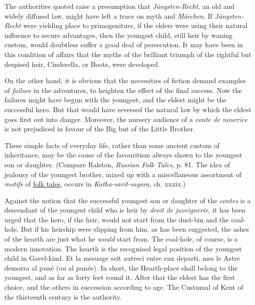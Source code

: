 \documentclass[14pt,a4paper]{memoir}
\newcommand{\ul}[1]{\uline{#1}}
\begin{document}
{The authorities quoted raise a presumption that \emph{Jüngsten-Recht},
an old and widely diffused law, might have left a trace on myth and
\emph{Märchen}. If \emph{Jüngsten-Recht} were yielding place to
primogeniture, if the elders were using their natural influence to
secure advantages, then the youngest child, still heir by waning custom,
would doubtless suffer a good deal of persecution. It may have been in
this condition of affairs that the myths of the brilliant triumph of the
rightful but despised heir, Cinderella, or Boots, were developed.

On the other hand, it is obvious that the necessities of fiction demand
examples of \emph{failure} in the adventures, to heighten the effect of
the final success. Now the failures might have begun with the youngest,
and the eldest might be the successful hero. But that would have
reversed the natural law by which the eldest goes first out into danger.
Moreover, the nursery audience of a \emph{conte de nourrice} is not
prejudiced in favour of the Big but of the Little Brother.

These simple facts of everyday life, rather than some ancient custom of
inheritance, may be the cause of the favouritism always shown to the
youngest son or daughter. (Compare Ralston, \emph{Russian Folk Tales},
p. 81. The idea of jealousy of the youngest brother, mixed up with a
miscellaneous assortment of \emph{motifs} of \ul{folk tales}, occurs in
\emph{Katha-sarit-sagara}, ch. xxxix.)

Against the notion that the successful youngest son or daughter of the
\emph{contes} is a descendant of the youngest child who is heir by
\emph{droit de juveignerie}, it has been urged that the hero, if the
heir, would \textquotesingle not start from the dust-bin and the
coal-hole.\textquotesingle{} But if his heirship were slipping from him,
as has been suggested, the ashes of the hearth are just what he
\emph{would} start from. The
\textquotesingle coal-hole,\textquotesingle{} of course, is a modern
innovation. The hearth is the recognised legal position of the youngest
child in Gavel-kind. \textquotesingle Et la mesuage seit autreci entre
eux departi, mes le {Astre} demorra al puné (ou al
punée).\textquotesingle{}
In short, \textquotesingle the Hearth-place shall belong to the
youngest,\textquotesingle{} and as far as forty feet round it. After
that the eldest has the first choice, and the others in succession
according to age. The Custumal of Kent of the thirteenth century is the
authority.

}
\end{document}

